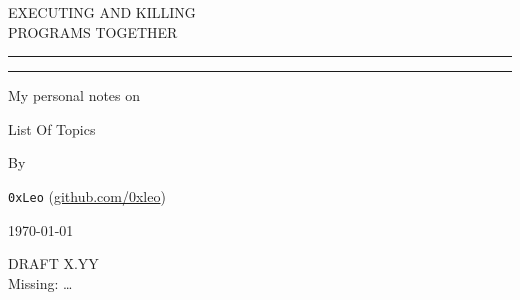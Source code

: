 \begin{titlepage}
	\vspace{0.75\baselineskip} %
	
	{\LARGE EXECUTING AND KILLING\\ \Large PROGRAMS TOGETHER\\} %
	
	\vspace{0.75\baselineskip} %
	
	\rule{\textwidth}{0.4pt}\vspace*{-\baselineskip}\vspace{3.2pt} %
	\rule{\textwidth}{1.6pt} %
	
	\vspace{2\baselineskip} %
	
	My personal notes on
	
	\vspace*{3\baselineskip} %
	
	List Of Topics
	
	\vspace*{3\baselineskip} %
	
	
	By
	
	\vspace{0.5\baselineskip} %
	
	{\normalfont \Large \texttt{0xLeo} (\url{github.com/0xleo}) \\} %
	
	\vspace{0.5\baselineskip} %
	
	
	\vfill %
	
	
	
	\vspace{0.3\baselineskip} %
	
	\today %
	
	{DRAFT X.YY} %
	{\\Missing: \ldots}

\end{titlepage}

